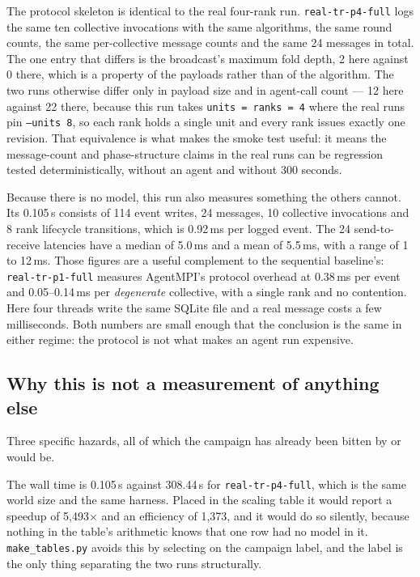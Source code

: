 \documentclass[11pt]{article}
\begin{document}
The protocol skeleton is identical to the real four-rank run. \texttt{real-tr-p4-full} logs the
same ten collective invocations with the same algorithms, the same round counts, the same
per-collective message counts and the same 24 messages in total. The one entry that differs is
the broadcast's maximum fold depth, 2 here against 0 there, which is a property of the payloads
rather than of the algorithm. The two runs otherwise differ
only in payload size and in agent-call count --- 12 here against 22 there, because this run takes
\texttt{units = ranks = 4} where the real runs pin \texttt{--units 8}, so each rank holds a single
unit and every rank issues exactly one revision. That equivalence is what makes the smoke test
useful: it means the message-count and phase-structure claims in the real runs can be regression
tested deterministically, without an agent and without 300 seconds.

Because there is no model, this run also measures something the others cannot. Its 0.105\,s
consists of 114 event writes, 24 messages, 10 collective invocations and 8 rank lifecycle
transitions, which is 0.92\,ms per logged event. The 24 send-to-receive latencies have a median of
5.0\,ms and a mean of 5.5\,ms, with a range of 1 to 12\,ms. Those figures are a useful complement
to the sequential baseline's: \texttt{real-tr-p1-full} measures AgentMPI's protocol overhead at
0.38\,ms per event and 0.05--0.14\,ms per \emph{degenerate} collective, with a single rank and no
contention. Here four threads write the same SQLite file and a real message costs a few
milliseconds. Both numbers are small enough that the conclusion is the same in either regime: the
protocol is not what makes an agent run expensive.

\subsection*{Why this is not a measurement of anything else}

Three specific hazards, all of which the campaign has already been bitten by or would be.

The wall time is 0.105\,s against 308.44\,s for \texttt{real-tr-p4-full}, which is the same world
size and the same harness. Placed in the scaling table it would report a speedup of 5{,}493$\times$
and an efficiency of 1{,}373, and it would do so silently, because nothing in the table's
arithmetic knows that one row had no model in it. \texttt{make\_tables.py} avoids this by
selecting on the campaign label, and the label is the only thing separating the two runs
structurally.
\end{document}
